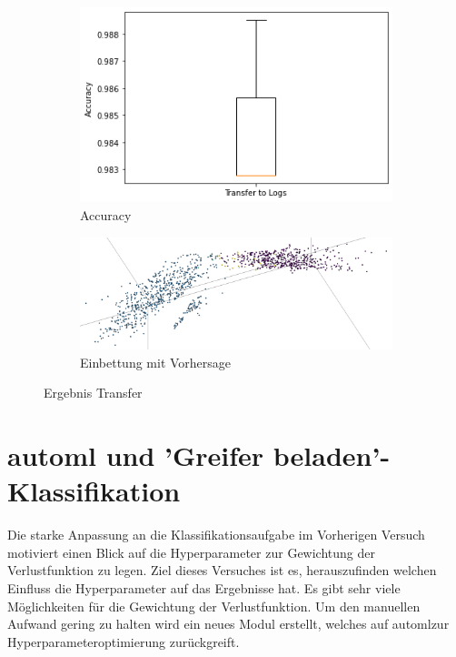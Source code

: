		 \begin{figure}[h]
			\centering
			\begin{subfigure}[c]{0.49\textwidth}			
				\includegraphics[width=1\textwidth,center]{bilder/Hauptteil/Transfer_Logs/Acc_Transfer_Logs.png}
				\caption{Accuracy}
				\label{img:AccuracyTransferLogs}	
			\end{subfigure}
			\begin{subfigure}[c]{0.49\textwidth}			
				\includegraphics[width=1\textwidth, center]{bilder/Hauptteil/Transfer_Logs/Logs_transfer_emb.png}
				\caption{Einbettung mit Vorhersage}
				\label{img:Einbettung_Logs_Vorhersage}	
			\end{subfigure}
			\caption{Ergebnis Transfer}
			\label{img:Ergebnis_Transfer}
		\end{figure}
	
		
	\section{\ac{automl} und 'Greifer beladen'-Klassifikation}
	\label{sec:Transfer_autoMl}
	Die starke Anpassung an die Klassifikationsaufgabe im Vorherigen Versuch motiviert einen Blick auf die Hyperparameter zur Gewichtung der Verlustfunktion zu legen. Ziel dieses Versuches ist es, herauszufinden welchen Einfluss die Hyperparameter auf das Ergebnisse hat. Es gibt sehr viele Möglichkeiten für die Gewichtung der Verlustfunktion. Um den manuellen Aufwand gering zu halten wird ein neues Modul erstellt, welches auf \ac{automl}zur Hyperparameteroptimierung zurückgreift.
